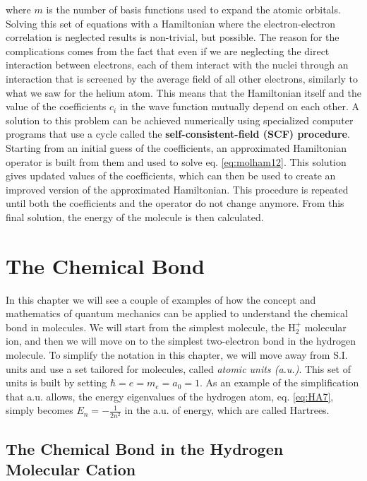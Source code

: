 \documentclass[
  9pt,
]{extbook}
\theoremstyle{definition}
\theoremstyle{definition}
\theoremstyle{definition}
\theoremstyle{remark}
\begin{document}
where \(m\) is the number of basis functions used to expand the atomic orbitals. Solving this set of equations with a Hamiltonian where the electron-electron correlation is neglected results is non-trivial, but possible. The reason for the complications comes from the fact that even if we are neglecting the direct interaction between electrons, each of them interact with the nuclei through an interaction that is screened by the average field of all other electrons, similarly to what we saw for the helium atom. This means that the Hamiltonian itself and the value of the coefficients \(c_i\) in the wave function mutually depend on each other. A solution to this problem can be achieved numerically using specialized computer programs that use a cycle called the \textbf{self-consistent-field (SCF) procedure}. Starting from an initial guess of the coefficients, an approximated Hamiltonian operator is built from them and used to solve eq. \eqref{eq:molham12}. This solution gives updated values of the coefficients, which can then be used to create an improved version of the approximated Hamiltonian. This procedure is repeated until both the coefficients and the operator do not change anymore. From this final solution, the energy of the molecule is then calculated.

\hypertarget{Bonds}{%
\chapter{The Chemical Bond}\label{Bonds}}

In this chapter we will see a couple of examples of how the concept and mathematics of quantum mechanics can be applied to understand the chemical bond in molecules. We will start from the simplest molecule, the \(\mathrm{H}_2^+\) molecular ion, and then we will move on to the simplest two-electron bond in the hydrogen molecule. To simplify the notation in this chapter, we will move away from S.I. units and use a set tailored for molecules, called \emph{atomic units (a.u.)}. This set of units is built by setting \(\hbar=e=m_e=a_0=1\). As an example of the simplification that a.u. allows, the energy eigenvalues of the hydrogen atom, eq. \eqref{eq:HA7}, simply becomes \(E_n=-\frac{1}{2n^2}\) in the a.u. of energy, which are called Hartrees.

\hypertarget{the-chemical-bond-in-the-hydrogen-molecular-cation}{%
\section{The Chemical Bond in the Hydrogen Molecular Cation}\label{the-chemical-bond-in-the-hydrogen-molecular-cation}}
\end{document}
